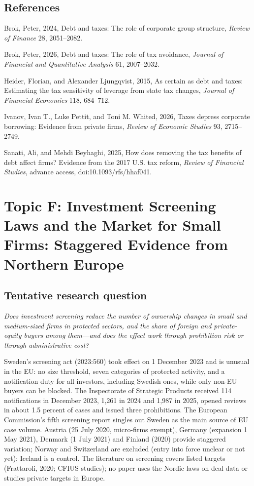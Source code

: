 \documentclass[12pt,a4paper]{article}
\newenvironment{refs}{\begin{list}{}{\setlength{\leftmargin}{1.5em}\setlength{\itemindent}{-1.5em}\setlength{\itemsep}{1pt}}}{\end{list}}
\begin{document}
\subsection*{References}
\begin{refs}
\item Brok, Peter, 2024, Debt and taxes: The role of corporate group structure, \emph{Review of Finance} 28, 2051--2082.
\item Brok, Peter, 2026, Debt and taxes: The role of tax avoidance, \emph{Journal of Financial and Quantitative Analysis} 61, 2007--2032.
\item Heider, Florian, and Alexander Ljungqvist, 2015, As certain as debt and taxes: Estimating the tax sensitivity of leverage from state tax changes, \emph{Journal of Financial Economics} 118, 684--712.
\item Ivanov, Ivan T., Luke Pettit, and Toni M. Whited, 2026, Taxes depress corporate borrowing: Evidence from private firms, \emph{Review of Economic Studies} 93, 2715--2749.
\item Sanati, Ali, and Mehdi Beyhaghi, 2025, How does removing the tax benefits of debt affect firms? Evidence from the 2017 U.S. tax reform, \emph{Review of Financial Studies}, advance access, doi:10.1093/rfs/hhaf041.
\end{refs}

\newpage

\section{Topic F: Investment Screening Laws and the Market for Small Firms: Staggered Evidence from Northern Europe}

\subsection{Tentative research question}

\emph{Does investment screening reduce the number of ownership changes in small and medium-sized firms in protected sectors, and the share of foreign and private-equity buyers among them---and does the effect work through prohibition risk or through administrative cost?}

Sweden's screening act (2023:560) took effect on 1 December 2023 and is unusual in the EU: no size threshold, seven categories of protected activity, and a notification duty for all investors, including Swedish ones, while only non-EU buyers can be blocked. The Inspectorate of Strategic Products received 114 notifications in December 2023, 1,261 in 2024 and 1,987 in 2025, opened reviews in about 1.5 percent of cases and issued three prohibitions. The European Commission's fifth screening report singles out Sweden as the main source of EU case volume. Austria (25 July 2020, micro-firms exempt), Germany (expansion 1 May 2021), Denmark (1 July 2021) and Finland (2020) provide staggered variation; Norway and Switzerland are excluded (entry into force unclear or not yet); Iceland is a control. The literature on screening covers listed targets (Frattaroli, 2020; CFIUS studies); no paper uses the Nordic laws on deal data or studies private targets in Europe.
\end{document}
